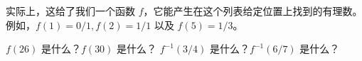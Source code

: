 \begin{enumerate}
  \begin{center}
  
  \end{center}
  
  \workbookpagebreak
  
  实际上，这给了我们一个函数 $f$，它能产生在这个列表给定位置上找到的有理数。
  例如，$f(1) = 0/1, f(2) = 1/1$ 以及 $f(5) = 1/3$。
  
  $f(26)$ 是什么？$f(30)$ 是什么？
  $f^{-1}(3/4)$ 是什么？$f^{-1}(6/7)$ 是什么？
    
  \wbvfill
  
  \workbookpagebreak
   
  \end{enumerate}
  
  
